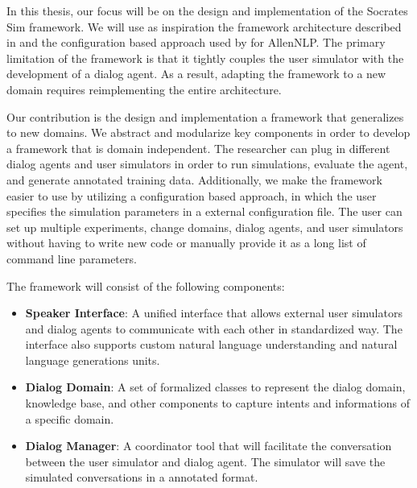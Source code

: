 In this thesis, our focus will be on the design and implementation of the Socrates Sim framework. We will use as inspiration the framework architecture described in \cite{li_usersim} and the configuration based approach used by \cite{Gardner_allennlp} for AllenNLP. The primary limitation of the \cite{li_end_to_end} framework is that it tightly couples the user simulator with the development of a dialog agent. As a result, adapting the framework to a new domain requires reimplementing the entire architecture. 

Our contribution is the design and implementation a framework that generalizes to new domains. We abstract and modularize key components in order to develop a framework that is domain independent. The researcher can plug in different dialog agents and user simulators in order to run simulations, evaluate the agent, and generate annotated training data. Additionally, we make the framework easier to use by utilizing a configuration based approach, in which the user specifies the simulation parameters in a external configuration file. The user can set up multiple experiments, change domains, dialog agents, and user simulators without having to write new code or manually provide it as a long list of command line parameters. 

The framework will consist of the following components:
\begin{itemize}
	\item \textbf{Speaker Interface}: A unified interface that allows external user simulators and dialog agents to communicate with each other in standardized way. The interface also supports custom natural language understanding and natural language generations units. 
	\item \textbf{Dialog Domain}: A set of formalized classes to represent the dialog domain, knowledge base, and other components to capture intents and informations of a specific domain. 
	\item \textbf{Dialog Manager}: A coordinator tool that will facilitate the conversation between the user simulator and dialog agent. The simulator will save the simulated conversations in a annotated format.
\end{itemize}


